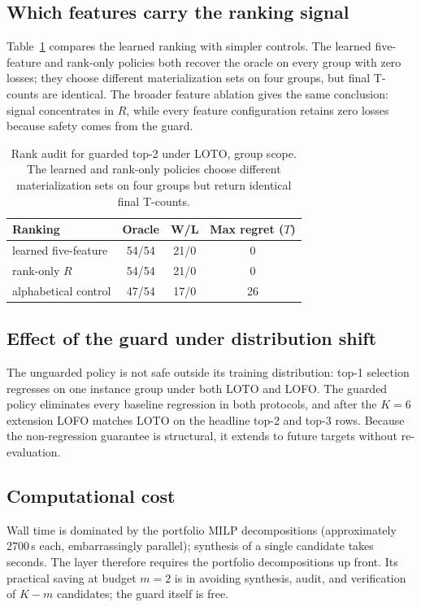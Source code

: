 \documentclass{cbctq}
\begin{document}
\subsection{Which features carry the ranking signal}

Table~\ref{tab:rankaudit} compares the learned ranking with simpler controls. The learned five-feature and rank-only policies both recover the oracle on every group with zero losses; they choose different materialization sets on four groups, but final T-counts are identical. The broader feature ablation gives the same conclusion: signal concentrates in $R$, while every feature configuration retains zero losses because safety comes from the guard.

\begin{table}[hbt]
\centering
\caption{\footnotesize Rank audit for guarded top-2 under LOTO, group scope. The learned and rank-only policies choose different materialization sets on four groups but return identical final T-counts.}
\label{tab:rankaudit}
\footnotesize
\begin{tabular}{lccc}
\toprule
Ranking & Oracle & W/L & Max regret ($T$) \\
\midrule
learned five-feature & 54/54 & 21/0 & 0 \\
rank-only $R$        & 54/54 & 21/0 & 0 \\
alphabetical control & 47/54 & 17/0 & 26 \\
\bottomrule
\end{tabular}
\end{table}

\subsection{Effect of the guard under distribution shift}

The unguarded policy is not safe outside its training distribution: top-1 selection regresses on one instance group under both LOTO and LOFO. The guarded policy eliminates every baseline regression in both protocols, and after the $K=6$ extension LOFO matches LOTO on the headline top-2 and top-3 rows. Because the non-regression guarantee is structural, it extends to future targets without re-evaluation.

\subsection{Computational cost}

Wall time is dominated by the portfolio MILP decompositions (approximately 2700\,s each, embarrassingly parallel); synthesis of a single candidate takes seconds. The layer therefore requires the portfolio decompositions up front. Its practical saving at budget $m=2$ is in avoiding synthesis, audit, and verification of $K-m$ candidates; the guard itself is free.
\end{document}

